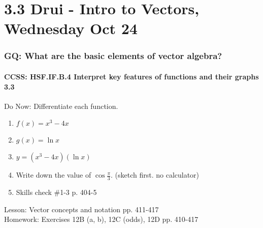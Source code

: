 \documentclass{beamer}
\begin{document}
\section{3.3 Drui - Intro to Vectors, Wednesday Oct 24}
  \frame
  {
    \frametitle{GQ: What are the basic elements of vector algebra?}
    \framesubtitle{CCSS: HSF.IF.B.4 Interpret key features of functions and their graphs \qquad \alert{3.3}}

    \begin{block}{Do Now: Differentiate each function.}
    \begin{enumerate}
        \item $f(x)=x^3-4x$
        \item $g(x)=\ln x$
        \item $y=(x^3-4x)(\ln x)$
        \item Write down the value of $\displaystyle \cos \frac{\pi}{3}$. (sketch first. no calculator)
        \item Skills check \#1-3 p. 404-5
    \end{enumerate}
    \end{block}
    Lesson: Vector concepts and notation pp. 411-417\\ \bigskip
    Homework: Exercises 12B (a, b), 12C (odds), 12D pp. 410-417
  }
\end{document}

